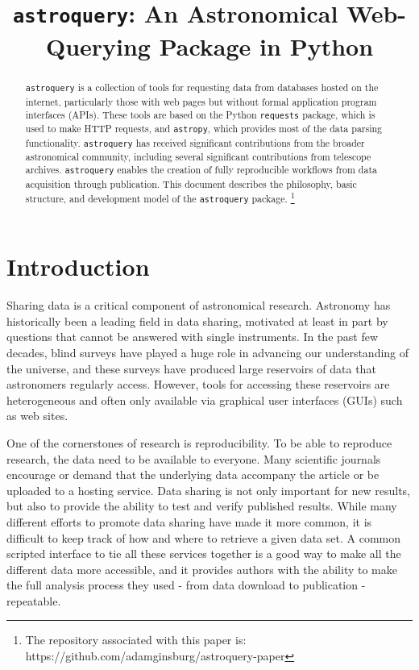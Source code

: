 \documentclass[twocolumn]{aastex61}
\newcommand{\package}[1]{\texttt{#1}\xspace}
\newcommand{\astroquery}{\package{astroquery}}
\newcommand{\astropypkg}{\package{astropy}}
\begin{document}


\title{\astroquery: An Astronomical Web-Querying Package in Python}

\begin{abstract}
\astroquery is a collection of tools for requesting data from databases hosted
on the internet, particularly those with web pages but without formal
application program interfaces (APIs).  These tools are based on the Python
\package{requests} package, which is used to make HTTP requests, and
\astropypkg, which provides most of the data parsing functionality. \astroquery
has received significant contributions from the broader astronomical community,
including several significant contributions from telescope archives.
\astroquery enables the creation of fully reproducible workflows from data
acquisition through publication.  This document describes the philosophy, basic
structure, and development model of the \astroquery package.
\footnote{
The repository associated with this paper is:
https://github.com/adamginsburg/astroquery-paper
}
\end{abstract}


\section{Introduction}
Sharing data is a critical component of astronomical research.  Astronomy
has historically been a leading field in data sharing, motivated at least
in part by questions that cannot be answered with single instruments.
In the past few decades, blind surveys have played a huge role in advancing our
understanding of the universe, and these surveys have produced large reservoirs
of data that astronomers regularly access.  However, tools for accessing these
reservoirs are heterogeneous and often only available via graphical user
interfaces (GUIs) such as web sites.

One of the cornerstones of research is reproducibility. To be able to reproduce
research, the data need to be available to everyone. Many scientific journals
encourage or demand that the underlying data  accompany the article or be
uploaded to a hosting service. Data sharing is not only important for new
results, but also to provide the ability to test and verify published results.
While many different efforts to promote data sharing have made it more
common, it is difficult to keep track of how and where to retrieve a given data
set. A common scripted interface to tie all these services together is a good
way to make all the different data more accessible, and it provides authors
with the ability to make the full analysis process they used - from data
download to publication - repeatable.
\end{document}
